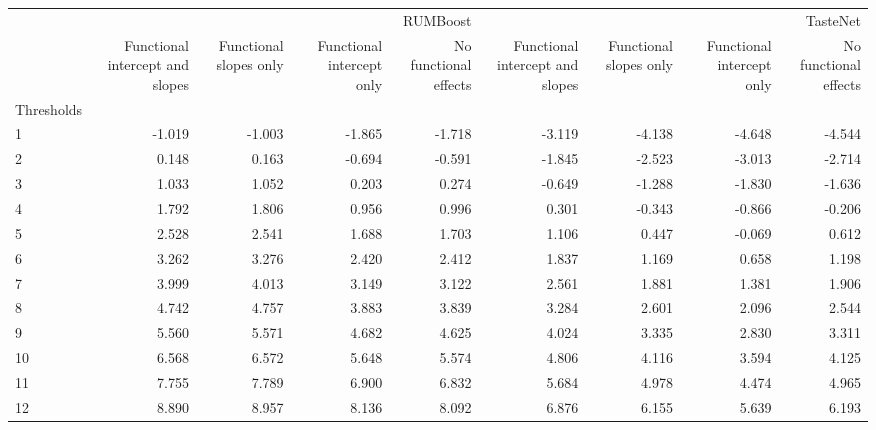 \begin{tabular}{lrrrrrrrr}
\toprule
 & \multicolumn{4}{r}{RUMBoost} & \multicolumn{4}{r}{TasteNet} \\
 & Functional intercept and slopes & Functional slopes only & Functional intercept only & No functional effects & Functional intercept and slopes & Functional slopes only & Functional intercept only & No functional effects \\
Thresholds &  &  &  &  &  &  &  &  \\
\midrule
1 & -1.019 & -1.003 & -1.865 & -1.718 & -3.119 & -4.138 & -4.648 & -4.544 \\
2 & 0.148 & 0.163 & -0.694 & -0.591 & -1.845 & -2.523 & -3.013 & -2.714 \\
3 & 1.033 & 1.052 & 0.203 & 0.274 & -0.649 & -1.288 & -1.830 & -1.636 \\
4 & 1.792 & 1.806 & 0.956 & 0.996 & 0.301 & -0.343 & -0.866 & -0.206 \\
5 & 2.528 & 2.541 & 1.688 & 1.703 & 1.106 & 0.447 & -0.069 & 0.612 \\
6 & 3.262 & 3.276 & 2.420 & 2.412 & 1.837 & 1.169 & 0.658 & 1.198 \\
7 & 3.999 & 4.013 & 3.149 & 3.122 & 2.561 & 1.881 & 1.381 & 1.906 \\
8 & 4.742 & 4.757 & 3.883 & 3.839 & 3.284 & 2.601 & 2.096 & 2.544 \\
9 & 5.560 & 5.571 & 4.682 & 4.625 & 4.024 & 3.335 & 2.830 & 3.311 \\
10 & 6.568 & 6.572 & 5.648 & 5.574 & 4.806 & 4.116 & 3.594 & 4.125 \\
11 & 7.755 & 7.789 & 6.900 & 6.832 & 5.684 & 4.978 & 4.474 & 4.965 \\
12 & 8.890 & 8.957 & 8.136 & 8.092 & 6.876 & 6.155 & 5.639 & 6.193 \\
\bottomrule
\end{tabular}
